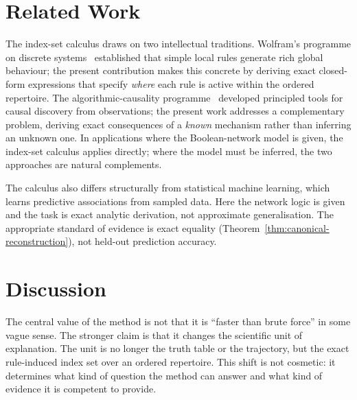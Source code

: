 \documentclass[11pt]{article}
\theoremstyle{definition}
\begin{document}
\section{Related Work}
The index-set calculus draws on two intellectual traditions. Wolfram's programme on discrete systems~\cite{wolfram2002new} established that simple local rules generate rich global behaviour; the present contribution makes this concrete by deriving exact closed-form expressions that specify \emph{where} each rule is active within the ordered repertoire. The algorithmic-causality programme~\cite{zenilcalculus,zenildeconv} developed principled tools for causal discovery from observations; the present work addresses a complementary problem, deriving exact consequences of a \emph{known} mechanism rather than inferring an unknown one. In applications where the Boolean-network model is given, the index-set calculus applies directly; where the model must be inferred, the two approaches are natural complements.

The calculus also differs structurally from statistical machine learning, which learns predictive associations from sampled data. Here the network logic is given and the task is exact analytic derivation, not approximate generalisation. The appropriate standard of evidence is exact equality (Theorem~\ref{thm:canonical-reconstruction}), not held-out prediction accuracy.

\section{Discussion}
The central value of the method is not that it is ``faster than brute force'' in some vague sense. The stronger claim is that it changes the scientific unit of explanation. The unit is no longer the truth table or the trajectory, but the exact rule-induced index set over an ordered repertoire. This shift is not cosmetic: it determines what kind of question the method can answer and what kind of evidence it is competent to provide.
\end{document}
